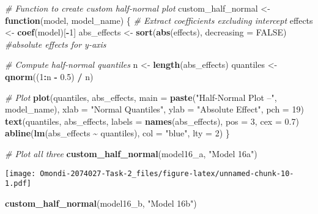 \documentclass[
]{article}
\newenvironment{Shaded}{\begin{snugshade}}{\end{snugshade}}
\newcommand{\AttributeTok}[1]{\textcolor[rgb]{0.13,0.29,0.53}{#1}}
\newcommand{\CommentTok}[1]{\textcolor[rgb]{0.56,0.35,0.01}{\textit{#1}}}
\newcommand{\ConstantTok}[1]{\textcolor[rgb]{0.56,0.35,0.01}{#1}}
\newcommand{\ControlFlowTok}[1]{\textcolor[rgb]{0.13,0.29,0.53}{\textbf{#1}}}
\newcommand{\DecValTok}[1]{\textcolor[rgb]{0.00,0.00,0.81}{#1}}
\newcommand{\FloatTok}[1]{\textcolor[rgb]{0.00,0.00,0.81}{#1}}
\newcommand{\FunctionTok}[1]{\textcolor[rgb]{0.13,0.29,0.53}{\textbf{#1}}}
\newcommand{\NormalTok}[1]{#1}
\newcommand{\OtherTok}[1]{\textcolor[rgb]{0.56,0.35,0.01}{#1}}
\newcommand{\SpecialCharTok}[1]{\textcolor[rgb]{0.81,0.36,0.00}{\textbf{#1}}}
\newcommand{\StringTok}[1]{\textcolor[rgb]{0.31,0.60,0.02}{#1}}
\begin{document}
\begin{Shaded}
\begin{Highlighting}[]
\CommentTok{\# Function to create custom half{-}normal plot}
\NormalTok{custom\_half\_normal }\OtherTok{\textless{}{-}} \ControlFlowTok{function}\NormalTok{(model, model\_name) \{}
  \CommentTok{\# Extract coefficients excluding intercept}
\NormalTok{  effects }\OtherTok{\textless{}{-}} \FunctionTok{coef}\NormalTok{(model)[}\SpecialCharTok{{-}}\DecValTok{1}\NormalTok{]}
\NormalTok{  abs\_effects }\OtherTok{\textless{}{-}} \FunctionTok{sort}\NormalTok{(}\FunctionTok{abs}\NormalTok{(effects), }\AttributeTok{decreasing =} \ConstantTok{FALSE}\NormalTok{) }\CommentTok{\#absolute effects for y{-}axis}
  
  \CommentTok{\# Compute half{-}normal quantiles}
\NormalTok{  n }\OtherTok{\textless{}{-}} \FunctionTok{length}\NormalTok{(abs\_effects)}
\NormalTok{  quantiles }\OtherTok{\textless{}{-}} \FunctionTok{qnorm}\NormalTok{((}\DecValTok{1}\SpecialCharTok{:}\NormalTok{n }\SpecialCharTok{{-}} \FloatTok{0.5}\NormalTok{) }\SpecialCharTok{/}\NormalTok{ n)}
  
  \CommentTok{\# Plot}
  \FunctionTok{plot}\NormalTok{(quantiles, abs\_effects,}
       \AttributeTok{main =} \FunctionTok{paste}\NormalTok{(}\StringTok{"Half{-}Normal Plot –"}\NormalTok{, model\_name),}
       \AttributeTok{xlab =} \StringTok{"Normal Quantiles"}\NormalTok{,}
       \AttributeTok{ylab =} \StringTok{"Absolute Effect"}\NormalTok{,}
       \AttributeTok{pch =} \DecValTok{19}\NormalTok{)}
  \FunctionTok{text}\NormalTok{(quantiles, abs\_effects, }\AttributeTok{labels =} \FunctionTok{names}\NormalTok{(abs\_effects), }\AttributeTok{pos =} \DecValTok{3}\NormalTok{, }\AttributeTok{cex =} \FloatTok{0.7}\NormalTok{)}
  \FunctionTok{abline}\NormalTok{(}\FunctionTok{lm}\NormalTok{(abs\_effects }\SpecialCharTok{\textasciitilde{}}\NormalTok{ quantiles), }\AttributeTok{col =} \StringTok{"blue"}\NormalTok{, }\AttributeTok{lty =} \DecValTok{2}\NormalTok{)}
\NormalTok{\}}

\CommentTok{\# Plot all three }
\FunctionTok{custom\_half\_normal}\NormalTok{(model16\_a, }\StringTok{"Model 16a"}\NormalTok{)}
\end{Highlighting}
\end{Shaded}

\texttt{[image: Omondi-2074027-Task-2\_files/figure-latex/unnamed-chunk-10-1.pdf]}

\begin{Shaded}
\begin{Highlighting}[]
\FunctionTok{custom\_half\_normal}\NormalTok{(model16\_b, }\StringTok{"Model 16b"}\NormalTok{)}
\end{Highlighting}
\end{Shaded}
\end{document}
